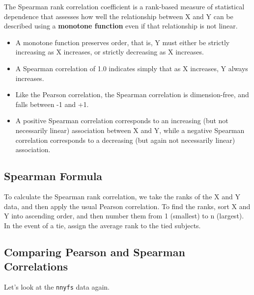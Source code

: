 \documentclass[
]{book}
\newenvironment{Shaded}{\begin{snugshade}}{\end{snugshade}}
\newcommand{\KeywordTok}[1]{\textcolor[rgb]{0.13,0.29,0.53}{\textbf{#1}}}
\newcommand{\NormalTok}[1]{#1}
\newcommand{\OperatorTok}[1]{\textcolor[rgb]{0.81,0.36,0.00}{\textbf{#1}}}
\newcommand{\StringTok}[1]{\textcolor[rgb]{0.31,0.60,0.02}{#1}}
\providecommand{\tightlist}{%
  \setlength{\itemsep}{0pt}\setlength{\parskip}{0pt}}
\begin{document}
The Spearman rank correlation coefficient is a rank-based measure of statistical dependence that assesses how well the relationship between X and Y can be described using a \textbf{monotone function} even if that relationship is not linear.

\begin{itemize}
\tightlist
\item
  A monotone function preserves order, that is, Y must either be strictly increasing as X increases, or strictly decreasing as X increases.
\item
  A Spearman correlation of 1.0 indicates simply that as X increases, Y always increases.
\item
  Like the Pearson correlation, the Spearman correlation is dimension-free, and falls between -1 and +1.
\item
  A positive Spearman correlation corresponds to an increasing (but not necessarily linear) association between X and Y, while a negative Spearman correlation corresponds to a decreasing (but again not necessarily linear) association.
\end{itemize}

\hypertarget{spearman-formula}{%
\subsection{Spearman Formula}\label{spearman-formula}}

To calculate the Spearman rank correlation, we take the ranks of the X and Y data, and then apply the usual Pearson correlation. To find the ranks, sort X and Y into ascending order, and then number them from 1 (smallest) to n (largest). In the event of a tie, assign the average rank to the tied subjects.

\hypertarget{comparing-pearson-and-spearman-correlations}{%
\subsection{Comparing Pearson and Spearman Correlations}\label{comparing-pearson-and-spearman-correlations}}

Let's look at the \texttt{nnyfs} data again.

\begin{Shaded}
\end{Shaded}
\end{document}
